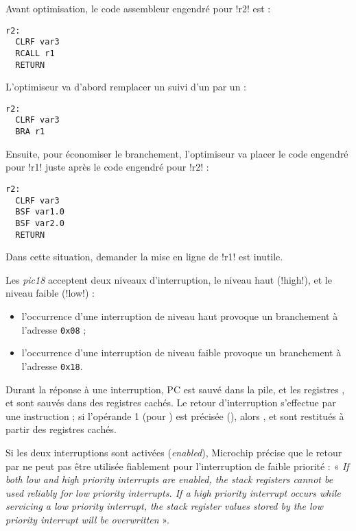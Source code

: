 Avant optimisation, le code assembleur engendré pour \pic!r2! est :
\begin{lstlisting}[language=assembleur]
r2:
  CLRF var3
  RCALL r1
  RETURN
\end{lstlisting}

L'optimiseur va d'abord remplacer un  suivi d'un  par un  :
\begin{lstlisting}[language=assembleur]
r2:
  CLRF var3
  BRA r1
\end{lstlisting}

Ensuite, pour économiser le branchement, l'optimiseur va placer le code engendré pour \pic!r1! juste après le code engendré pour \pic!r2! :
\begin{lstlisting}[language=assembleur]
r2:
  CLRF var3
  BSF var1.0
  BSF var2.0
  RETURN
\end{lstlisting}

Dans cette situation, demander la mise en ligne de \pic!r1! est inutile.






Les \emph{pic18} acceptent deux niveaux d’interruption, le niveau haut (\pic!high!), et le niveau faible (\pic!low!) :
\begin{itemize}
  \item l’occurrence d’une interruption de niveau haut provoque un branchement à l’adresse \texttt{0x08} ;
  \item l’occurrence d’une interruption de niveau faible provoque un branchement à l’adresse \texttt{0x18}.
\end{itemize}

Durant la réponse à une interruption, PC est sauvé dans la pile, et les registres ,  et  sont sauvés dans des registres cachés. Le retour d’interruption s’effectue par une instruction  ; si l’opérande 1 (pour ) est précisée (), alors ,  et  sont restitués à partir des registres cachés.

Si les deux interruptions sont activées (\emph{enabled}), Microchip précise que le retour par  ne peut pas être utilisée fiablement pour l’interruption de faible priorité : « \emph{If both low and high priority interrupts are enabled, the stack registers cannot be used reliably for low priority interrupts. If a high priority interrupt occurs while servicing a low priority interrupt, the stack register values stored by the low priority interrupt will be overwritten} ».

